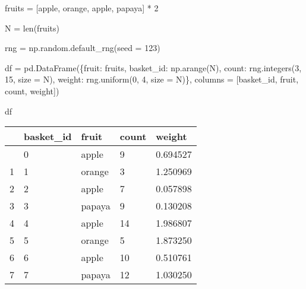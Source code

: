 \documentclass[
  letterpaper,
  DIV=11,
  numbers=noendperiod]{scrreprt}
\newenvironment{Shaded}{\begin{snugshade}}{\end{snugshade}}
\newcommand{\BuiltInTok}[1]{\textcolor[rgb]{0.00,0.23,0.31}{#1}}
\newcommand{\DecValTok}[1]{\textcolor[rgb]{0.68,0.00,0.00}{#1}}
\newcommand{\NormalTok}[1]{\textcolor[rgb]{0.00,0.23,0.31}{#1}}
\newcommand{\OperatorTok}[1]{\textcolor[rgb]{0.37,0.37,0.37}{#1}}
\newcommand{\StringTok}[1]{\textcolor[rgb]{0.13,0.47,0.30}{#1}}
\begin{document}
\begin{Shaded}
\begin{Highlighting}[]
\NormalTok{fruits }\OperatorTok{=}\NormalTok{ [}\StringTok{\textquotesingle{}apple\textquotesingle{}}\NormalTok{, }\StringTok{\textquotesingle{}orange\textquotesingle{}}\NormalTok{, }\StringTok{\textquotesingle{}apple\textquotesingle{}}\NormalTok{, }\StringTok{\textquotesingle{}papaya\textquotesingle{}}\NormalTok{] }\OperatorTok{*} \DecValTok{2}

\NormalTok{N }\OperatorTok{=} \BuiltInTok{len}\NormalTok{(fruits)}

\NormalTok{rng }\OperatorTok{=}\NormalTok{ np.random.default\_rng(seed }\OperatorTok{=} \DecValTok{123}\NormalTok{)}
\end{Highlighting}
\end{Shaded}

\begin{Shaded}
\begin{Highlighting}[]
\NormalTok{df }\OperatorTok{=}\NormalTok{ pd.DataFrame(\{}\StringTok{\textquotesingle{}fruit\textquotesingle{}}\NormalTok{: fruits,}
                  \StringTok{\textquotesingle{}basket\_id\textquotesingle{}}\NormalTok{: np.arange(N),}
                   \StringTok{\textquotesingle{}count\textquotesingle{}}\NormalTok{: rng.integers(}\DecValTok{3}\NormalTok{, }\DecValTok{15}\NormalTok{, size }\OperatorTok{=}\NormalTok{ N),}
                  \StringTok{\textquotesingle{}weight\textquotesingle{}}\NormalTok{: rng.uniform(}\DecValTok{0}\NormalTok{, }\DecValTok{4}\NormalTok{, size }\OperatorTok{=}\NormalTok{ N)\},}
\NormalTok{                 columns }\OperatorTok{=}\NormalTok{ [}\StringTok{\textquotesingle{}basket\_id\textquotesingle{}}\NormalTok{, }\StringTok{\textquotesingle{}fruit\textquotesingle{}}\NormalTok{, }\StringTok{\textquotesingle{}count\textquotesingle{}}\NormalTok{, }\StringTok{\textquotesingle{}weight\textquotesingle{}}\NormalTok{])}

\NormalTok{df}
\end{Highlighting}
\end{Shaded}

\begin{longtable}[]{@{}lllll@{}}
\toprule\noalign{}
& basket\_id & fruit & count & weight \\
\midrule\noalign{}
\endhead
\bottomrule\noalign{}
\endlastfoot
0 & 0 & apple & 9 & 0.694527 \\
1 & 1 & orange & 3 & 1.250969 \\
2 & 2 & apple & 7 & 0.057898 \\
3 & 3 & papaya & 9 & 0.130208 \\
4 & 4 & apple & 14 & 1.986807 \\
5 & 5 & orange & 5 & 1.873250 \\
6 & 6 & apple & 10 & 0.510761 \\
7 & 7 & papaya & 12 & 1.030250 \\
\end{longtable}
\end{document}
